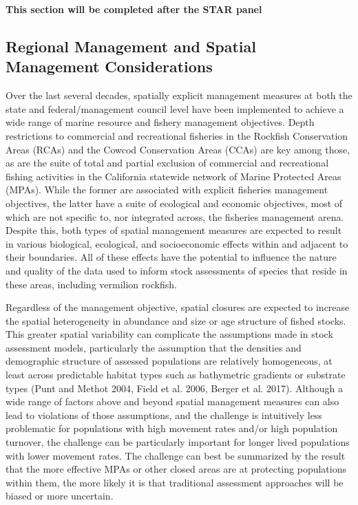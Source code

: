 \documentclass[
  english,
  a4paper,
]{article}
\begin{document}
\textbf{This section will be completed after the STAR panel}

\hypertarget{regional-management-and-spatial-management-considerations}{%
\subsection{Regional Management and Spatial Management Considerations}\label{regional-management-and-spatial-management-considerations}}

Over the last several decades, spatially explicit management measures at both the state and federal/management council level have been implemented to achieve a wide range of marine resource and fishery management objectives. Depth restrictions to commercial and recreational fisheries in the Rockfish Conservation Areas (RCAs) and the Cowcod Conservation Areas (CCAs) are key among those, as are the suite of total and partial exclusion of commercial and recreational fishing activities in the California statewide network of Marine Protected Areas (MPAs). While the former are associated with explicit fisheries management objectives, the latter have a suite of ecological and economic objectives, most of which are not specific to, nor integrated across, the fisheries management arena. Despite this, both types of spatial management measures are expected to result in various biological, ecological, and socioeconomic effects within and adjacent to their boundaries. All of these effects have the potential to influence the nature and quality of the data used to inform stock assessments of species that reside in these areas, including vermilion rockfish.

Regardless of the management objective, spatial closures are expected to increase the spatial heterogeneity in abundance and size or age structure of fished stocks. This greater spatial variability can complicate the assumptions made in stock assessment models, particularly the assumption that the densities and demographic structure of assessed populations are relatively homogeneous, at least across predictable habitat types such as bathymetric gradients or substrate types (Punt and Methot 2004, Field et al. 2006, Berger et al. 2017). Although a wide range of factors above and beyond spatial management measures can also lead to violations of those assumptions, and the challenge is intuitively less problematic for populations with high movement rates and/or high population turnover, the challenge can be particularly important for longer lived populations with lower movement rates. The challenge can best be summarized by the result that the more effective MPAs or other closed areas are at protecting populations within them, the more likely it is that traditional assessment approaches will be biased or more uncertain.
\end{document}
